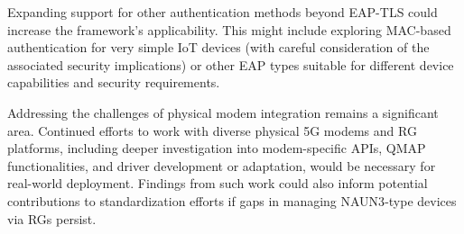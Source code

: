 Expanding support for other authentication methods beyond \ac{EAP-TLS} could increase the framework's applicability. This might include exploring \ac{MAC}-based authentication for very simple \ac{IoT} devices (with careful consideration of the associated security implications) or other \ac{EAP} types suitable for different device capabilities and security requirements.

Addressing the challenges of physical modem integration remains a significant area. Continued efforts to work with diverse physical \ac{5G} modems and \ac{RG} platforms, including deeper investigation into modem-specific \acp{API}, \ac{QMAP} functionalities, and driver development or adaptation, would be necessary for real-world deployment. Findings from such work could also inform potential contributions to standardization efforts if gaps in managing \ac{NAUN3}-type devices via \acp{RG} persist.

